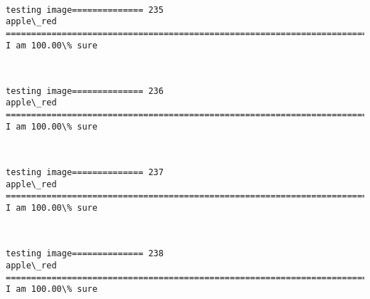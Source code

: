 \documentclass[11pt]{article}
\begin{document}
    \begin{center}
    \end{center}
    { \hspace*{\fill} \\}
    
    \begin{Verbatim}[commandchars=\\\{\}]
testing image============== 235
apple\_red
============================================================================
I am 100.00\% sure

    \end{Verbatim}

    \begin{center}
    \end{center}
    { \hspace*{\fill} \\}
    
    \begin{Verbatim}[commandchars=\\\{\}]
testing image============== 236
apple\_red
============================================================================
I am 100.00\% sure

    \end{Verbatim}

    \begin{center}
    \end{center}
    { \hspace*{\fill} \\}
    
    \begin{Verbatim}[commandchars=\\\{\}]
testing image============== 237
apple\_red
============================================================================
I am 100.00\% sure

    \end{Verbatim}

    \begin{center}
    \end{center}
    { \hspace*{\fill} \\}
    
    \begin{Verbatim}[commandchars=\\\{\}]
testing image============== 238
apple\_red
============================================================================
I am 100.00\% sure

    \end{Verbatim}
\end{document}
